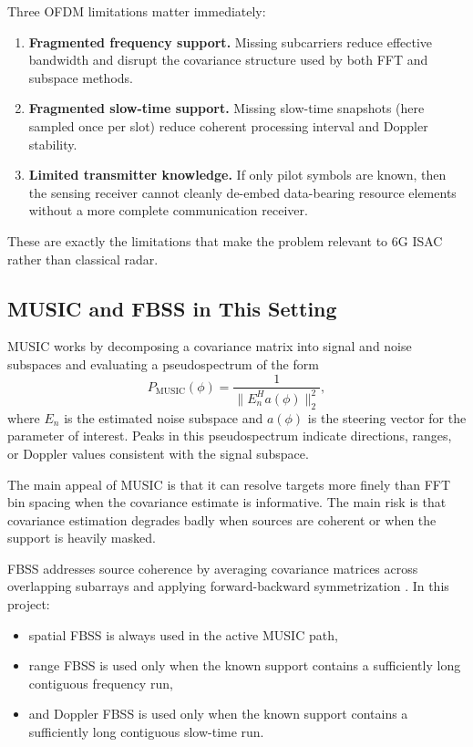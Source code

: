 \documentclass[11pt]{article}
\begin{document}
Three OFDM limitations matter immediately:
\begin{enumerate}
  \item \textbf{Fragmented frequency support.} Missing subcarriers reduce effective bandwidth and disrupt the covariance structure used by both FFT and subspace methods.
  \item \textbf{Fragmented slow-time support.} Missing slow-time snapshots (here sampled once per slot) reduce coherent processing interval and Doppler stability.
  \item \textbf{Limited transmitter knowledge.} If only pilot symbols are known, then the sensing receiver cannot cleanly de-embed data-bearing resource elements without a more complete communication receiver.
\end{enumerate}

These are exactly the limitations that make the problem relevant to 6G ISAC rather than classical radar.

\subsection{MUSIC and FBSS in This Setting}

MUSIC works by decomposing a covariance matrix into signal and noise subspaces and evaluating a pseudospectrum of the form \cite{schmidt1986}
\begin{equation}
P_{\mathrm{MUSIC}}(\phi)
=
\frac{1}{\lVert E_n^H a(\phi) \rVert_2^2},
\end{equation}
where $E_n$ is the estimated noise subspace and $a(\phi)$ is the steering vector for the parameter of interest. Peaks in this pseudospectrum indicate directions, ranges, or Doppler values consistent with the signal subspace.

The main appeal of MUSIC is that it can resolve targets more finely than FFT bin spacing when the covariance estimate is informative. The main risk is that covariance estimation degrades badly when sources are coherent or when the support is heavily masked.

FBSS addresses source coherence by averaging covariance matrices across overlapping subarrays and applying forward-backward symmetrization \cite{shan1985,pillai1989}. In this project:
\begin{itemize}
  \item spatial FBSS is always used in the active MUSIC path,
  \item range FBSS is used only when the known support contains a sufficiently long contiguous frequency run,
  \item and Doppler FBSS is used only when the known support contains a sufficiently long contiguous slow-time run.
\end{itemize}
\end{document}
